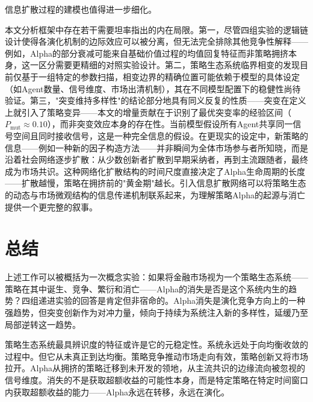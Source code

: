 信息扩散过程的建模也值得进一步细化。

本文分析框架中存在若干需要坦率指出的内在局限。第一，尽管四组实验的逻辑链设计使得各演化机制的边际效应可以被分离，但无法完全排除其他竞争性解释——例如，Alpha的部分衰减可能来自基础价值过程的均值回复特征而非策略拥挤本身，这一区分需要更精细的对照实验设计。第二，策略生态系统临界相变的发现目前仅基于一组特定的参数扫描，相变边界的精确位置可能依赖于模型的具体设定（如Agent数量、信号维度、市场出清机制），其在不同模型配置下的稳健性尚待验证。第三，"突变维持多样性"的结论部分地具有同义反复的性质——突变在定义上就引入了策略变异——本文的增量贡献在于识别了最优突变率的经验区间（$P_{\text{mut}} \approx 0.10$），而非突变效应本身的存在性。当前模型假设所有Agent共享同一信号空间且同时接收信号，这是一种完全信息的假设。在更现实的设定中，新策略的信息——例如一种新的因子构造方法——并非瞬间为全体市场参与者所知晓，而是沿着社会网络逐步扩散：从少数创新者扩散到早期采纳者，再到主流跟随者，最终成为市场共识。这种网络化扩散结构的时间尺度直接决定了Alpha生命周期的长度——扩散越慢，策略在拥挤前的"黄金期"越长。引入信息扩散网络可以将策略生态的动态与市场微观结构的信息传递机制联系起来，为理解策略Alpha的起源与消亡提供一个更完整的叙事。

\section{总结}

上述工作可以被概括为一次概念实验：如果将金融市场视为一个策略生态系统——策略在其中诞生、竞争、繁衍和消亡——Alpha的消失是否是这个系统内生的趋势？四组递进实验的回答是肯定但非宿命的。Alpha消失是演化竞争方向上的一种强趋势，但突变创新作为对冲力量，倾向于持续为系统注入新的多样性，延缓乃至局部逆转这一趋势。

策略生态系统最具辨识度的特征或许是它的元稳定性。系统永远处于向均衡收敛的过程中。但它从未真正到达均衡。策略竞争推动市场走向有效，策略创新又将市场拉开。Alpha从拥挤的策略迁移到未开发的领地，从主流共识的边缘流向被忽视的信号维度。消失的不是获取超额收益的可能性本身，而是特定策略在特定时间窗口内获取超额收益的能力——Alpha永远在转移，永远在演化。
